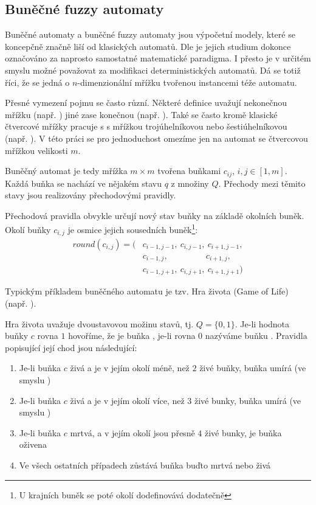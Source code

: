 \subsection{Buněčné fuzzy automaty}
Buněčné automaty a buněčné fuzzy automaty jsou výpočetní modely, které se koncepčně značně liší od klasických automatů. Dle \cite{Wol-NewKinSci} je jejich studium dokonce označováno za naprosto samostatné matematické paradigma. I přesto je v určitém smyslu možné považovat za modifikaci  deterministických automatů. Dá se totiž říci, že se jedná o $n$-dimenzionální mřížku tvořenou instancemi téže automatu.

Přesné vymezení pojmu  se často různí. Některé definice uvažují nekonečnou mřížku (např. \cite{Wol-NewKinSci, Wol-CelAut, BatXie-CellCity}) jiné zase konečnou (např. \cite{Wu-ExpGenPolUrbGroCelAutCit}). Také se často kromě klasické čtvercové mřížky pracuje s s mřížkou trojúhelníkovou nebo šestiúhelníkovou (např. \cite{For-FuzCelAutConjNormForm}). V této práci se pro jednoduchost omezíme jen na automat se čtvercovou mřížkou velikosti $m$.

Buněčný automat je tedy mřížka $m \times m$ tvořena buňkami $c_{ij}$, $i, j \in [1,m]$. Každá buňka se nachází ve nějakém stavu $q$ z množiny $Q$. Přechody mezi těmito stavy jsou realizovány přechodovými pravidly. 

Přechodová pravidla obvykle určují nový stav buňky na základě okolních buněk. Okolí buňky $c_{i,j}$ je osmice jejich sousedních buněk\footnote{U krajních buněk se poté okolí dodefinovává dodatečně}:
\begin{align*}
 round(c_{i,j}) = (
  & c_{i-1, j-1},\ 	c_{i, j-1},\ 	c_{i+1, j-1},	\\
  & c_{i-1, j  },\ 	\qquad \qquad\ 	c_{i+1, j  },	\\
  & c_{i-1, j+1},\ 	c_{i, j+1},\ 	c_{i+1, j+1}	
 )
\end{align*}

\begin{example} \label{ex:GameOfLife}
  Typickým příkladem buněčného automatu je tzv. Hra života (Game of Life) (např. \cite{TofMar-CelAuMach+}).
  
  Hra života uvažuje dvoustavovou možinu stavů, tj. $Q = \{ 0, 1 \}$. Je-li hodnota buňky $c$ rovna $1$ hovoříme, že je buňka , je-li rovna $0$ nazýváme buňku . Pravidla popisující její chod jsou následující:
  \begin{enumerate}
   \item Je-li buňka $c$ živá a je v jejím okolí méně, než $2$ živé buňky, buňka umírá (ve smyslu )
   \item Je-li buňka $c$ živá a je v jejím okolí více, než $3$ živé bunky, buňka umírá (ve smyslu )
   \item Je-li buňka $c$ mrtvá, a v jejím okolí jsou přesně $4$ živé bunky, je buňka oživena
   \item Ve všech ostatních případech zůstává buňka buďto mrtvá nebo živá 
  \end{enumerate}
\end{example}

